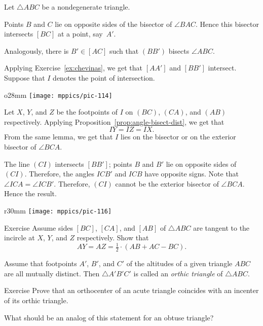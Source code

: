 Let $\triangle ABC$ be a nondegenerate triangle.

Points $B$ and $C$ lie on opposite sides of the bisector of $\angle BAC$.
Hence this bisector intersects $[BC]$ at a point, say~$A'$.

Analogously, there is $B'\in[AC]$ 
such that $(BB')$ bisects $\angle ABC$.

Applying Exercise~\ref{ex:chevinas},
we get that $[AA']$ and $[BB']$ intersect.
Suppose that $I$ denotes the point of intersection.

{

\begin{wrapfigure}{o}{28mm}
\vskip0mm
\centering
\texttt{[image: mppics/pic-114]}
\end{wrapfigure}

Let $X$, $Y$, and $Z$ be the footpoints of $I$ on  $(B C)$, $(C A)$, and $(A B)$ respectively.
Applying Proposition~\ref{prop:angle-bisect-dist}, we get that
$$I Y=I Z=I X.$$
From the same lemma, we get that $I$ lies on the bisector or on the exterior bisector of $\angle B C A$.

The line $(C I)$ intersects $[B B']$;
points $B$ and $B'$ lie on opposite sides of~$(C I)$.
Therefore, the angles $I C B'$ and $I C B$ have opposite signs.
Note that $\angle I C A=\angle I C B'$.
Therefore, $(C I)$ cannot be the exterior bisector of $\angle B C A$.
Hence the result.
\qeds

}

{

\begin{wrapfigure}{r}{30mm}
\centering
\vskip-2mm
\texttt{[image: mppics/pic-116]}
\end{wrapfigure}

\begin{thm}{Exercise}\label{ex:2x=b+c-a}
Assume sides $[B C]$, $[C A]$, and $[A B]$ of $\triangle A B C$ are tangent to the incircle at $X$, $Y$, and $Z$ respectively. 
Show that 
$$AY=AZ= \tfrac12\cdot(A B+ A C- B C).$$

\end{thm}

Assume that footpoints $A'$, $B'$, and $C'$ of the altitudes of a given triangle $ABC$ are all mutually distinct.
Then $\triangle A'B'C'$ is called an \emph{orthic triangle} of $\triangle ABC$.

}

\begin{thm}{Exercise}\label{ex:orthic-triangle}
Prove that an orthocenter of an acute triangle coincides with an incenter of its orthic triangle.

What should be an analog of this statement for an obtuse triangle?
\end{thm}

